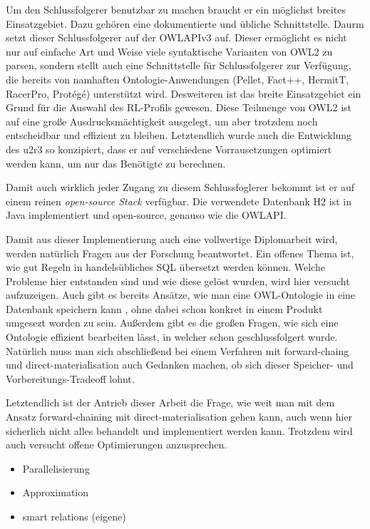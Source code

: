 Um den Schlussfolgerer benutzbar zu machen braucht er ein möglichst breites Einsatzgebiet. Dazu gehören eine dokumentierte und übliche Schnittstelle. Daurm setzt dieser Schlussfolgerer auf der OWLAPIv3 \cite{OWLAPI} auf. Dieser ermöglicht es nicht nur auf einfache Art und Weise viele syntaktische Varianten von OWL2 zu parsen, sondern stellt auch eine Schnittstelle für Schlussfolgerer zur Verfügung, die bereits von namhaften Ontologie-Anwendungen (Pellet, Fact++, HermitT, RacerPro, Protégé) unterstützt wird. Desweiteren ist das breite Einsatzgebiet ein Grund für die Auswahl des RL-Profils gewesen. Diese Teilmenge von OWL2 ist auf eine große Ausdrucksmächtigkeit ausgelegt, um aber trotzdem noch entscheidbar und effizient zu bleiben. Letztendlich wurde auch die Entwicklung des u2r3 so konzipiert, dass er auf verschiedene Vorrausetzungen optimiert werden kann, um nur das Benötigte zu berechnen.

Damit auch wirklich jeder Zugang zu diesem Schlussfoglerer bekommt ist er auf einem reinen \emph{open-source Stack} verfügbar. Die verwendete Datenbank H2 ist in Java implementiert und open-source, genauso wie die OWLAPI.

Damit aus dieser Implementierung auch eine vollwertige Diplomarbeit wird, werden natürlich Fragen aus der Forschung beantwortet. Ein offenes Thema ist, wie gut Regeln in handelsübliches SQL übersetzt werden können. Welche Probleme hier entstanden sind und wie diese gelöst wurden, wird hier versucht aufzuzeigen. Auch gibt es bereits Ansätze, wie man eine OWL-Ontologie in eine Datenbank speichern kann \cite{Kleb2009OWLDB}, ohne dabei schon konkret in einem Produkt umgesezt worden zu sein. Außerdem gibt es die großen Fragen, wie sich eine Ontologie effizient bearbeiten lässt, in welcher schon geschlussfolgert wurde. Natürlich muss man sich abschließend bei einem Verfahren mit forward-chaing und direct-materialisation auch Gedanken machen, ob sich dieser Speicher- und Vorbereitungs-Tradeoff lohnt.

Letztendlich ist der Antrieb dieser Arbeit die Frage, wie weit man mit dem Ansatz forward-chaining mit direct-materialisation gehen kann, auch wenn hier sicherlich nicht alles behandelt und implementiert werden kann. Trotzdem wird auch versucht offene Optimierungen anzusprechen.

\begin{itemize}
  \item Parallelisierung
  \item Approximation
  \item smart relations (eigene)
\end{itemize}

